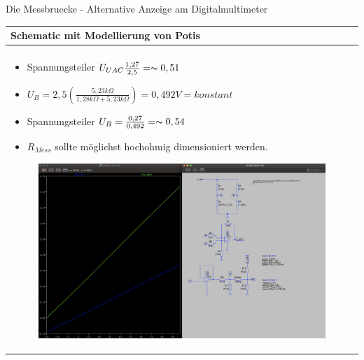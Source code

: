 \begin{frame}[t]{Die Messbruecke - Alternative Anzeige am Digitalmultimeter}

    \begin{spacing}{0.9} \begin{tiny}
            \begin{table}[h!]
                \begin{tabular}{p{10cm} }
                    \hline
                    \textbf{Schematic mit Modellierung von Potis} \\
                    \hline                                        \\
                    \begin{minipage}{\textwidth}
                        \begin{itemize}
                            \item Spannungsteiler $U_{UAC} \frac{1,27}{2,5}=\thicksim 0,51$
                            \item $U_{B}=2,5(\frac{5,23k\Omega}{1,28k\Omega+5,23k\Omega})=0,492V=konstant$
                            \item Spannungsteiler $U_{B}=\frac{0,27}{0,492}=\thicksim 0,54$
                            \item $R_{Mess}$ sollte möglichst hochohmig dimensioniert werden.
                        \end{itemize}
                        \begin{figure}
                            \centering
                            \includegraphics[width=0.7\linewidth]{pictures/digi_mul_anpassung_2.png}
                        \end{figure}
                    \end{minipage}
                \end{tabular}

            \end{table}

        \end{tiny} \end{spacing}

\end{frame}

